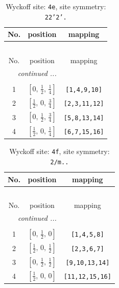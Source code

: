 \documentclass[fleqn,8pt]{jsarticle}
\begin{document}
\begin{longtable}{ccc}
\caption{Wyckoff site: {\tt 4e}, site symmetry: {\tt 22'2'.}}
 \\
 \hline \hline
No. & position & mapping \\ \hline \endfirsthead

\multicolumn{2}{l}{\tablename\ \thetable{}} \\
 \hline \hline
No. & position & mapping \\ \hline \endhead

 \hline \hline
\multicolumn{2}{r}{\footnotesize\it continued ...} \\ \endfoot

 \hline \hline
\multicolumn{2}{r}{} \\ \endlastfoot

1 & $\left[ 0,\, \frac{1}{2},\, \frac{1}{4} \right]$ & {\tt [1,4,9,10]} \\ \hline
2 & $\left[ \frac{1}{2},\, 0,\, \frac{3}{4} \right]$ & {\tt [2,3,11,12]} \\ \hline
3 & $\left[ 0,\, \frac{1}{2},\, \frac{3}{4} \right]$ & {\tt [5,8,13,14]} \\ \hline
4 & $\left[ \frac{1}{2},\, 0,\, \frac{1}{4} \right]$ & {\tt [6,7,15,16]} \\
\end{longtable}
\renewcommand{\arraystretch}{1.2}
\begin{longtable}{ccc}
\caption{Wyckoff site: {\tt 4f}, site symmetry: {\tt 2/m..}}
 \\
 \hline \hline
No. & position & mapping \\ \hline \endfirsthead

\multicolumn{2}{l}{\tablename\ \thetable{}} \\
 \hline \hline
No. & position & mapping \\ \hline \endhead

 \hline \hline
\multicolumn{2}{r}{\footnotesize\it continued ...} \\ \endfoot

 \hline \hline
\multicolumn{2}{r}{} \\ \endlastfoot

1 & $\left[ 0,\, \frac{1}{2},\, 0 \right]$ & {\tt [1,4,5,8]} \\ \hline
2 & $\left[ \frac{1}{2},\, 0,\, \frac{1}{2} \right]$ & {\tt [2,3,6,7]} \\ \hline
3 & $\left[ 0,\, \frac{1}{2},\, \frac{1}{2} \right]$ & {\tt [9,10,13,14]} \\ \hline
4 & $\left[ \frac{1}{2},\, 0,\, 0 \right]$ & {\tt [11,12,15,16]} \\
\end{longtable}
\end{document}
